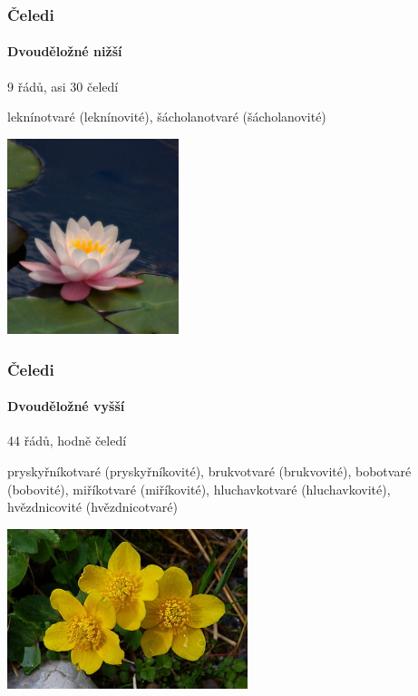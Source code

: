 \documentclass{beamer}
\begin{document}
\begin{frame}
\frametitle{Čeledi}
	\framesubtitle{Dvouděložné nižší}

9 řádů, asi 30 čeledí

leknínotvaré (leknínovité), šácholanotvaré (šácholanovité)
\begin{center}\includegraphics[width=5cm]{30_days_of_gratitude-_Day_1_(4063918440).jpg}\end{center}
\end{frame}
\begin{frame}
\frametitle{Čeledi}
	\framesubtitle{Dvouděložné vyšší}

44 řádů, hodně čeledí

pryskyřníkotvaré (pryskyřníkovité), brukvotvaré (brukvovité), bobotvaré (bobovité), miříkotvaré (miříkovité), hluchavkotvaré (hluchavkovité), hvězdnicovité (hvězdnicotvaré)
\begin{center}\includegraphics[width=7cm]{387px-Caltha_palustris_a.jpg}\end{center}


\end{frame}
\end{document}
